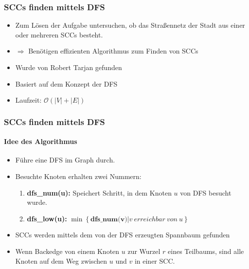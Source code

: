 \begin{frame}
	\frametitle{SCCs finden mittels DFS}
	\begin{itemize}
		\item Zum Lösen der Aufgabe untersuchen, ob das Straßennetz der Stadt aus einer oder mehreren SCCs besteht.
		\item $\Rightarrow$ Benötigen effizienten Algorithmus zum Finden von SCCs 
	\end{itemize}	
	\pause
	\begin{itemize}
		\item Wurde von Robert Tarjan gefunden
		\item Basiert auf dem Konzept der DFS
		\item Laufzeit: $\mathcal{O}(|V| + |E|)$
	\end{itemize}
\end{frame}
\begin{frame}
\frametitle{SCCs finden mittels DFS}
\framesubtitle{Idee des Algorithmus}
	\begin{itemize}
		\item Führe eine DFS im Graph durch.
		\item Besuchte Knoten erhalten zwei Nummern:
		\pause
			\begin{enumerate}
				\item \textbf{dfs\_num(u):} Speichert Schritt, in dem Knoten $u$ von DFS besucht wurde.
				\item \textbf{dfs\_low(u):}  $\min \left \{\textbf{dfs\_num(v)} | v \ erreichbar \ von \ u \right \}$
			\end{enumerate}
		\pause
		\item SCCs werden mittels dem von der DFS erzeugten Spannbaum gefunden
		\pause
		\item Wenn Backedge von einem Knoten $u$ zur Wurzel $r$ eines Teilbaums, sind alle Knoten auf \newline
		dem Weg zwischen $u$ und $v$ in einer SCC.
	
	\end{itemize}
\end{frame}
